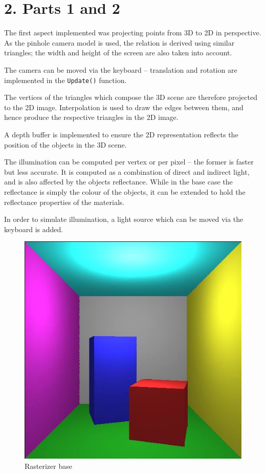 \documentclass[DIV=calc, paper=a4, fontsize=11pt, twocolumn]{article}	 %
\begin{document}
	\section*{2. Parts 1 and 2}
	The first aspect implemented was projecting points from 3D to 2D in perspective. As the pinhole camera model is used, the relation is derived using similar triangles; the width and height of the screen are also taken into account.
	\par
	The camera can be moved via the keyboard -- translation and rotation are implemented in the \texttt{Update()} function.
	\par
	The vertices of the triangles which compose the 3D scene are therefore projected to the 2D image. Interpolation is used to draw the edges between them, and hence produce the respective triangles in the 2D image.
	\par
	A depth buffer is implemented to ensure the 2D representation reflects the position of the objects in the 3D scene.
	\par
	The illumination can be computed per vertex or per pixel -- the former is faster but less accurate. It is computed as a combination of direct and indirect light, and is also affected by the objects reflectance. While in the base case the reflectance is simply the colour of the objects, it can be extended to hold the reflectance properties of the materials.
	\par
	In order to simulate illumination, a light source which can be moved via the keyboard is added.
	\begin{figure}[!htp]
		\begin{minipage}{.95\linewidth}
			\includegraphics[width=\linewidth]{rast_base.jpg}
			\captionsetup{belowskip=4pt,aboveskip=-11pt}
			\caption{Rasterizer base}
			\label{graph}
		\end{minipage}
	\end{figure}
	
\end{document}
